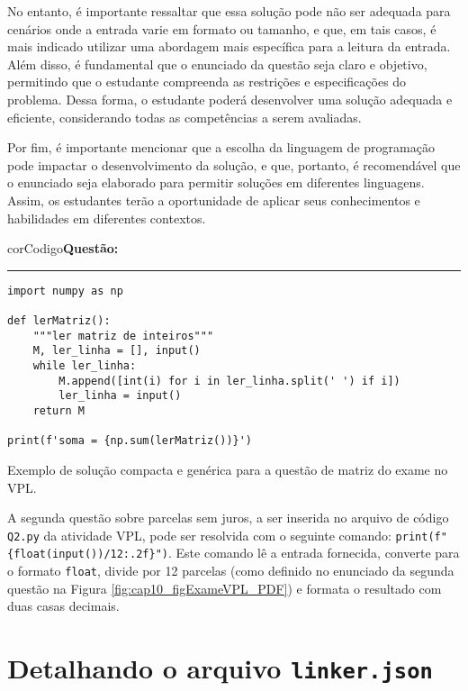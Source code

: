 No entanto, é importante ressaltar que essa solução pode não ser adequada para cenários onde a entrada varie em formato ou tamanho, e que, em tais casos, é mais indicado utilizar uma abordagem mais específica para a leitura da entrada. Além disso, é fundamental que o enunciado da questão seja claro e objetivo, permitindo que o estudante compreenda as restrições e especificações do problema. Dessa forma, o estudante poderá desenvolver uma solução adequada e eficiente, considerando todas as competências a serem avaliadas.

Por fim, é importante mencionar que a escolha da linguagem de programação pode impactar o desenvolvimento da solução, e que, portanto, é recomendável que o enunciado seja elaborado para permitir soluções em diferentes linguagens. Assim, os estudantes terão a oportunidade de aplicar seus conhecimentos e habilidades em diferentes contextos.

\begin{listing}[!ht]
\begin{myboxCode}{corCodigo}{\textbf{Questão: } }\vspace{3mm}
\hrule
\begin{verbatim}
import numpy as np

def lerMatriz(): 
    """ler matriz de inteiros"""
    M, ler_linha = [], input()
    while ler_linha:
        M.append([int(i) for i in ler_linha.split(' ') if i])
        ler_linha = input()
    return M
  
print(f'soma = {np.sum(lerMatriz())}')
\end{verbatim}
\end{myboxCode}
\caption{Exemplo de solução compacta e genérica para a questão de matriz do exame no VPL.}
\label{lst:ExameVPLsolucao2Q1}
\end{listing}

A segunda questão sobre parcelas sem juros, a ser inserida no arquivo de código \verb|Q2.py| da atividade VPL, pode ser resolvida com o seguinte comando: \verb|print(f"{float(input())/12:.2f}")|. Este comando lê a entrada fornecida, converte para o formato \verb|float|, divide por 12 parcelas (como definido no enunciado da segunda questão na Figura \ref{fig:cap10_figExameVPL_PDF}) e formata o resultado com duas casas decimais.


\section{Detalhando o arquivo \texttt{linker.json}}

